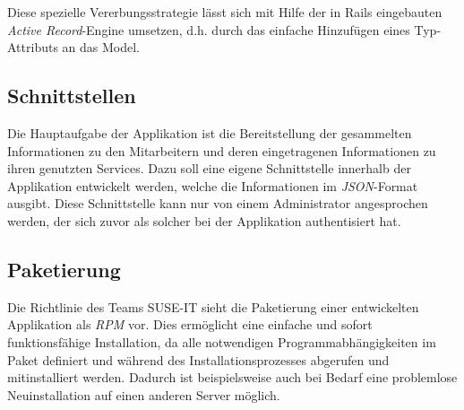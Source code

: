 
Diese spezielle Vererbungsstrategie lässt sich mit Hilfe der in Rails eingebauten
\textit{Active Record}-Engine umsetzen, d.h. durch das einfache Hinzufügen eines Typ-Attributs an das Model.

\subsection{Schnittstellen}
\label{sec:Schnittstellen}
Die Hauptaufgabe der Applikation ist die Bereitstellung der gesammelten Informationen zu den
Mitarbeitern und deren eingetragenen Informationen zu ihren genutzten Services. Dazu soll eine
eigene Schnittstelle innerhalb der Applikation entwickelt werden, welche die Informationen im
\textit{JSON}-Format ausgibt. Diese Schnittstelle kann nur von einem Administrator angesprochen
werden, der sich zuvor als solcher bei der Applikation authentisiert hat.


\subsection{Paketierung}
\label{sec:Paketierung}
Die Richtlinie des Teams SUSE-IT sieht die Paketierung einer entwickelten Applikation als
\textit{\acs{RPM}} vor. Dies ermöglicht eine einfache und sofort funktionsfähige Installation, da alle
notwendigen Programmabhängigkeiten im Paket definiert und während des Installationsprozesses
abgerufen und mitinstalliert werden. Dadurch ist beispielsweise auch bei Bedarf eine problemlose
Neuinstallation auf einen anderen Server möglich.
